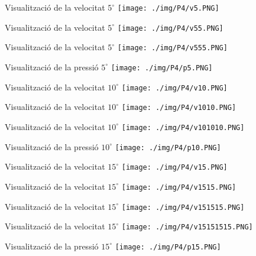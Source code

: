 \documentclass[10pt]{beamer}
\begin{document}
  \begin{frame}{Visualització de la velocitat $5^{\circ}$}
    \centering
    \texttt{[image: ./img/P4/v5.PNG]}
  \end{frame}
  \begin{frame}{Visualització de la velocitat $5^{\circ}$}
    \centering
    \texttt{[image: ./img/P4/v55.PNG]}
  \end{frame}
  \begin{frame}{Visualització de la velocitat $5^{\circ}$}
    \centering
    \texttt{[image: ./img/P4/v555.PNG]}
  \end{frame}
  \begin{frame}{Visualització de la pressió $5^{\circ}$}
    \centering
    \texttt{[image: ./img/P4/p5.PNG]}
  \end{frame}

  \begin{frame}{Visualització de la velocitat $10^{\circ}$}
    \centering
    \texttt{[image: ./img/P4/v10.PNG]}
  \end{frame}
  \begin{frame}{Visualització de la velocitat $10^{\circ}$}
    \centering
    \texttt{[image: ./img/P4/v1010.PNG]}
  \end{frame}
  \begin{frame}{Visualització de la velocitat $10^{\circ}$}
    \centering
    \texttt{[image: ./img/P4/v101010.PNG]}
  \end{frame}
  \begin{frame}{Visualització de la pressió $10^{\circ}$}
    \centering
    \texttt{[image: ./img/P4/p10.PNG]}
  \end{frame}

  \begin{frame}{Visualització de la velocitat $15^{\circ}$}
    \centering
    \texttt{[image: ./img/P4/v15.PNG]}
  \end{frame}
  \begin{frame}{Visualització de la velocitat $15^{\circ}$}
    \centering
    \texttt{[image: ./img/P4/v1515.PNG]}
  \end{frame}
  \begin{frame}{Visualització de la velocitat $15^{\circ}$}
    \centering
    \texttt{[image: ./img/P4/v151515.PNG]}
  \end{frame}
  \begin{frame}{Visualització de la velocitat $15^{\circ}$}
    \centering
    \texttt{[image: ./img/P4/v15151515.PNG]}
  \end{frame}
  \begin{frame}{Visualització de la pressió $15^{\circ}$}
    \centering
    \texttt{[image: ./img/P4/p15.PNG]}
  \end{frame}
\end{document}
